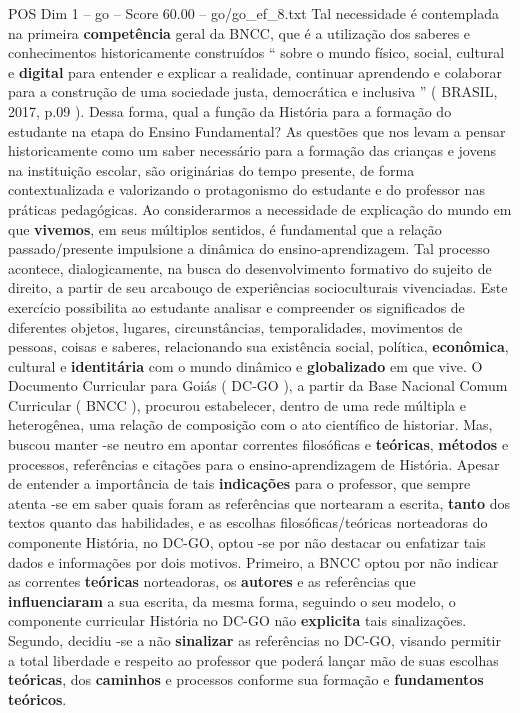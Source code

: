 \begin{textsample}{POS Dim 1 – go – Score 60.00 – go/go\_ef\_8.txt}
Tal necessidade é contemplada na primeira \textbf{competência} geral da BNCC, que é a utilização dos saberes e conhecimentos historicamente construídos “ sobre o mundo físico, social, cultural e \textbf{digital} para entender e explicar a realidade, continuar aprendendo e colaborar para a construção de uma sociedade justa, democrática e inclusiva ” ( BRASIL, 2017, p.09 ).
Dessa forma, qual a função da História para a formação do estudante na etapa do Ensino Fundamental?
As questões que nos levam a pensar historicamente como um saber necessário para a formação das crianças e jovens na instituição escolar, são originárias do tempo presente, de forma contextualizada e valorizando o protagonismo do estudante e do professor nas práticas pedagógicas.
Ao considerarmos a necessidade de explicação do mundo em que \textbf{vivemos}, em seus múltiplos sentidos, é fundamental que a relação passado/presente impulsione a dinâmica do ensino-aprendizagem.
Tal processo acontece, dialogicamente, na busca do desenvolvimento formativo do sujeito de direito, a partir de seu arcabouço de experiências socioculturais vivenciadas.
Este exercício possibilita ao estudante analisar e compreender os significados de diferentes objetos, lugares, circunstâncias, temporalidades, movimentos de pessoas, coisas e saberes, relacionando sua existência social, política, \textbf{econômica}, cultural e \textbf{identitária} com o mundo dinâmico e \textbf{globalizado} em que vive.
O Documento Curricular para Goiás ( DC-GO ), a partir da Base Nacional Comum Curricular ( BNCC ), procurou estabelecer, dentro de uma rede múltipla e heterogênea, uma relação de composição com o ato científico de historiar.
Mas, buscou manter -se neutro em apontar correntes filosóficas e \textbf{teóricas}, \textbf{métodos} e processos, referências e citações para o ensino-aprendizagem de História.
Apesar de entender a importância de tais \textbf{indicações} para o professor, que sempre atenta -se em saber quais foram as referências que nortearam a escrita, \textbf{tanto} dos textos quanto das habilidades, e as escolhas filosóficas/teóricas norteadoras do componente História, no DC-GO, optou -se por não destacar ou enfatizar tais dados e informações por dois motivos.
Primeiro, a BNCC optou por não indicar as correntes \textbf{teóricas} norteadoras, os \textbf{autores} e as referências que \textbf{influenciaram} a sua escrita, da mesma forma, seguindo o seu modelo, o componente curricular História no DC-GO não \textbf{explicita} tais sinalizações.
Segundo, decidiu -se a não \textbf{sinalizar} as referências no DC-GO, visando permitir a total liberdade e respeito ao professor que poderá lançar mão de suas escolhas \textbf{teóricas}, dos \textbf{caminhos} e processos conforme sua formação e \textbf{fundamentos} \textbf{teóricos}.

\end{textsample}
